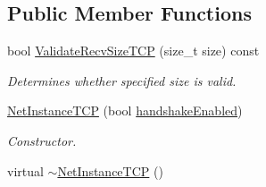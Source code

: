 \subsection*{Public Member Functions}
\begin{DoxyCompactItemize}
\item 
bool \hyperlink{class_net_instance_t_c_p_aed7c2c6c9c50f72e56c6c40f542e6a65}{ValidateRecvSizeTCP} (size\_\-t size) const 
\begin{DoxyCompactList}\small\item\em Determines whether specified size is valid. \item\end{DoxyCompactList}\item 
\hyperlink{class_net_instance_t_c_p_a1188f1bf75c414988bba7ae56728a418}{NetInstanceTCP} (bool \hyperlink{class_net_instance_t_c_p_af13f96901d3006beeda0c161f32cbfde}{handshakeEnabled})
\begin{DoxyCompactList}\small\item\em Constructor. \item\end{DoxyCompactList}\item 
\hypertarget{class_net_instance_t_c_p_a984a91c978f9c048cfa4ebf19eebc7c0}{
virtual \hyperlink{class_net_instance_t_c_p_a984a91c978f9c048cfa4ebf19eebc7c0}{$\sim$NetInstanceTCP} ()}
\label{class_net_instance_t_c_p_a984a91c978f9c048cfa4ebf19eebc7c0}


\end{DoxyCompactItemize}
